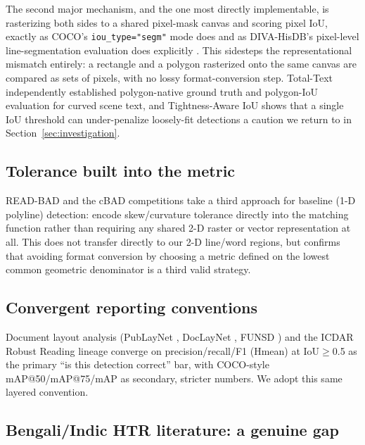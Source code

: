 \documentclass[11pt]{article}
\begin{document}
The second major mechanism, and the one most directly implementable, is rasterizing
both sides to a shared pixel-mask canvas and scoring pixel IoU, exactly as COCO's
\texttt{iou\_type="segm"} mode does \cite{lin2014coco} and as DIVA-HisDB's pixel-level
line-segmentation evaluation does explicitly \cite{simistira2017divahisdb}. This
sidesteps the representational mismatch entirely: a rectangle and a polygon rasterized
onto the same canvas are compared as sets of pixels, with no lossy format-conversion
step. Total-Text \cite{chng2017totaltext,chng2020totaltext} independently established
polygon-native ground truth and polygon-IoU evaluation for curved scene text, and
Tightness-Aware IoU \cite{liu2019tiou} shows that a single IoU threshold can under-penalize
loosely-fit detections \textemdash{} a caution we return to in Section~\ref{sec:investigation}.

\subsection{Tolerance built into the metric}

READ-BAD \cite{gruning2018readbad} and the cBAD competitions
\cite{diem2017cbad2017,diem2019cbad2019} take a third approach for baseline (1-D
polyline) detection: encode skew/curvature tolerance directly into the matching
function rather than requiring any shared 2-D raster or vector representation at all.
This does not transfer directly to our 2-D line/word regions, but confirms that
avoiding format conversion by choosing a metric defined on the lowest common geometric
denominator is a third valid strategy.

\subsection{Convergent reporting conventions}

Document layout analysis (PubLayNet \cite{zhong2019publaynet}, DocLayNet
\cite{pfitzmann2022doclaynet}, FUNSD \cite{jaume2019funsd}) and the ICDAR Robust
Reading lineage \cite{shahab2011icdar2011,karatzas2013icdar2013,karatzas2015icdar2015,nayef2019icdar19mlt}
converge on precision/recall/F1 (Hmean) at IoU$\geq$0.5 as the primary ``is this
detection correct'' bar, with COCO-style mAP@50/mAP@75/mAP \cite{lin2014coco} as
secondary, stricter numbers. We adopt this same layered convention.

\subsection{Bengali/Indic HTR literature: a genuine gap}
\end{document}

